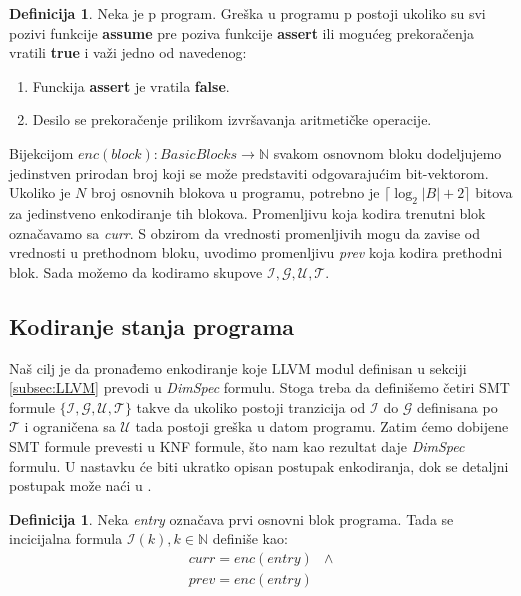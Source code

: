 \documentclass[a4paper]{article}
\theoremstyle{plain}
\theoremstyle{definition}
\newtheorem{defn}[thm]{Definicija} %
\begin{document}
\begin{defn}
    Neka je p program. Greška u programu p postoji ukoliko su svi pozivi funkcije \textbf{assume} pre poziva funkcije \textbf{assert} ili mogućeg prekoračenja vratili \textbf{true} i važi jedno od navedenog:
    \begin{enumerate}
        \item Funckija \textbf{assert} je vratila \textbf{false}.
        \item Desilo se prekoračenje prilikom izvršavanja aritmetičke operacije.
    \end{enumerate}
\end{defn}

Bijekcijom $\mathit{enc}(block) : BasicBlocks \rightarrow \mathbb{N}$ svakom osnovnom bloku dodeljujemo jedinstven prirodan broj koji se može predstaviti odgovarajućim bit-vektorom. Ukoliko je $N$ broj osnovnih blokova u programu, potrebno je $\lceil\log_{2}{|B| + 2}\rceil$ bitova za jedinstveno enkodiranje tih blokova. Promenljivu koja kodira trenutni blok označavamo sa \emph{curr}. S obzirom da vrednosti promenljivih mogu da zavise od vrednosti u prethodnom bloku, uvodimo promenljivu \emph{prev} koja kodira prethodni blok. Sada možemo da kodiramo skupove $\mathcal{I, G, U, T}$.


\subsection{Kodiranje stanja programa}
\label{subsec:KodiranjeStanja}

Naš cilj je da pronađemo enkodiranje koje LLVM modul definisan u sekciji \ref{subsec:LLVM} prevodi u \emph{DimSpec} formulu. Stoga treba da definišemo četiri SMT formule $\{\mathcal{I}, \mathcal{G}, \mathcal{U}, \mathcal{T}\}$ takve da ukoliko postoji tranzicija od $\mathcal{I}$ do $\mathcal{G}$ definisana po $\mathcal{T}$ i ograničena sa $\mathcal{U}$ tada postoji greška u datom programu. Zatim ćemo dobijene SMT formule prevesti u KNF formule, što nam kao rezultat daje \emph{DimSpec} formulu. U nastavku će biti ukratko opisan postupak enkodiranja, dok se detaljni postupak može naći u \cite{ubsmc}.

\begin{defn}
Neka \emph{entry} označava prvi osnovni blok programa. Tada se incicijalna formula $\mathcal{I}(k), k \in \mathbb{N}$ definiše kao:
    $$\begin{array}{rl}
    curr = enc(\mathit{entry}) & \wedge \\
    prev = enc(\mathit{entry}) &
    \end{array}$$
\end{defn}
\end{document}
